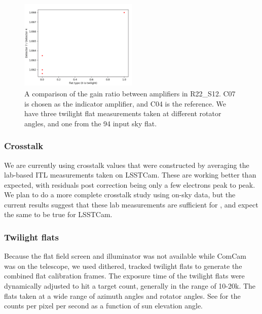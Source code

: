 \begin{figure}
  \begin{center}
  \includegraphics[width=0.5\textwidth]{figures/isr-f05-gain_ratios_by_flat.png}
  \caption{A comparison of the gain ratio between amplifiers in R22\_S12.  C07 is chosen as the indicator amplifier, and C04 is the reference.  We have three twilight flat measurements taken at different rotator angles, and one from the 94 input sky flat.}
  \label{fig:amp_gain_ratios}
  \end{center}
\end{figure}

\subsubsection{Crosstalk}

We are currently using crosstalk values that were constructed by averaging the lab-based ITL measurements taken on LSSTCam.
These are working better than expected, with residuals post correction being only a few electrons peak to peak.
We plan to do a more complete crosstalk study using on-sky data, but the current results suggest that these lab measurements are sufficient for \ComCam, and expect the same to be true for LSSTCam.

\subsubsection{Twilight flats}

Because the flat field screen and illuminator was not available while ComCam was on the telescope, we used dithered, tracked twilight flats to generate the combined flat calibration frames. The exposure time of the twilight flats were dynamically adjusted to hit a target count, generally in the range of 10-20k. The flats taken at a wide range of azimuth angles and rotator angles. See  for the counts per pixel per second as a function of sun elevation angle.

